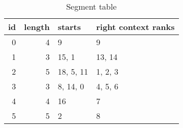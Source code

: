 \begin{table}
    \caption{Segment table}
    \label{tab:segment}
    \begin{tabular}{rrll}
        \toprule
        id & length & starts & right context ranks \\
        \midrule
        0 & 4 & 9           & 9         \\
        1 & 3 & 15, 1       & 13, 14    \\
        2 & 5 & 18, 5, 11   & 1, 2, 3   \\
        3 & 3 & 8, 14, 0    & 4, 5, 6   \\
        4 & 4 & 16          & 7         \\
        5 & 5 & 2           & 8         \\
        \bottomrule
    \end{tabular}
\end{table}


